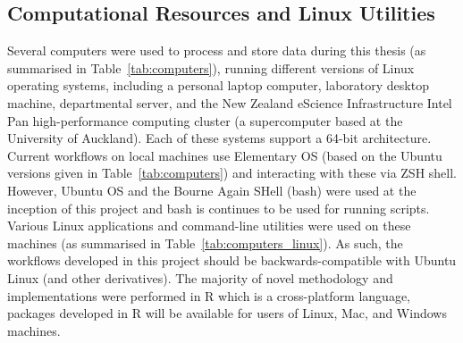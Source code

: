 \subsection{Computational Resources and Linux Utilities}

Several computers were used to process and store data during this thesis (as summarised in Table~\ref{tab:computers}), running different versions of Linux operating systems, including a personal laptop computer, laboratory desktop machine, departmental server, and the New Zealand eScience Infrastructure Intel Pan high-performance computing cluster (a supercomputer based at the University of Auckland). Each of these systems support a 64-bit architecture. Current workflows on local machines use Elementary OS (based on the Ubuntu versions given in Table~\ref{tab:computers}) and interacting with these via ZSH shell. However, Ubuntu OS and the Bourne Again SHell (bash) were used at the inception of this project and bash is continues to be used for running scripts. Various Linux applications and command-line utilities were used on these machines (as summarised in Table~\ref{tab:computers_linux}). As such, the workflows developed in this project should be backwards-compatible with Ubuntu Linux (and other derivatives). The majority of novel methodology and implementations were performed in R which is a cross-platform language, packages developed in R will be available for users of Linux, Mac, and Windows machines.  


